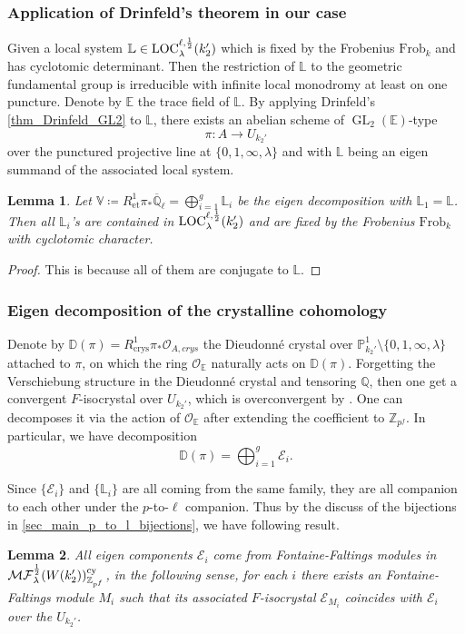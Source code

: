 \documentclass[12pt,twoside]{book}
\theoremstyle{plain}
\newtheorem{lemma}[lemma]{Lemma}
\theoremstyle{definition}
\theoremstyle{remark}
\newcommand{\bD}{{\mathbb D}}
\newcommand{\bL}{{\mathbb L}}
\newcommand{\bP}{{\mathbb P}}
\newcommand{\bQ}{{\mathbb Q}}
\newcommand{\bV}{{\mathbb V}}
\newcommand{\bZ}{{\mathbb Z}}
\newcommand{\mE}{{\mathcal E}}
\newcommand{\mO}{{\mathcal O}}
\DeclareMathOperator\GL{GL}
\newcommand{\crys}{\mathrm{crys}}
\newcommand{\et}{\mathrm{et}}
\newcommand{\MF}{\mathcal{MF}}
\newcommand{\Qbar}{{\overline{\mathbb Q}}}
\numberwithin{equation}{section}
\def\Loch{{\mathrm{LOC}^{\ell,{1\over 2}}_{\lambda}}}
\def\MFh{\MF^{{1\over 2}}_{\lambda}}
\def\Frob{\mathrm{Frob}}
\def\EK{{\mathbb E}}
\begin{document}
\subsubsection{Application of Drinfeld's theorem in our case}

Given a local system $\bL\in \Loch(k_2')$ which is fixed by the Frobenius $\Frob_k$ and has cyclotomic determinant. Then the restriction of $\bL$ to the geometric fundamental group is irreducible with infinite local monodromy at least on one puncture. Denote by $\EK$ the trace field of $\bL$. By applying Drinfeld's \autoref{thm_Drinfeld_GL2} to $\bL$, there exists an abelian scheme of $\GL_2(\EK)$-type
\[\pi \colon A \to U_{k_2'}\]
over the punctured projective line at $\{0,1,\infty,\lambda\}$ and with $\bL$ being an eigen summand of the associated local system.

\begin{lemma}
Let $\bV\coloneqq R^1_\et \pi_* \Qbar_{\ell}= \bigoplus_{i=1}^g \bL_i$ be the eigen decomposition with $\bL_1=\bL$. Then all $\bL_i$'s are contained in $\Loch(k_2')$ and are fixed by the Frobenius $\Frob_k$ with cyclotomic character.
\end{lemma}
\begin{proof}
This is because all of them are conjugate to $\bL$.
\end{proof}

\subsubsection{Eigen decomposition of the crystalline cohomology} \label{sec_subsub_family_to_rank2_cystal}
Denote by $\bD(\pi)=R^1_\crys \pi_* \mO_{A,crys}$ the Dieudonn\'e crystal over $\bP^1_{k_2'}\setminus\{0,1,\infty,\lambda\}$ attached to $\pi$, on which the ring $\mO_\EK$ naturally acts on $\bD(\pi)$. Forgetting the Verschiebung structure in the Dieudonn\'e crystal and tensoring $\bQ$, then one get a convergent $F$-isocrystal over $U_{k_2'}$, which is overconvergent by \cite[3.17]{Tri08}. One can decomposes it via the action of $\mO_\EK$ after extending the coefficient to $\bZ_{p^f}$. In particular, we have decomposition
\[\bD(\pi) = \bigoplus_{i=1}^{g}\mE_i.\]

Since $\{\mE_i\}$ and $\{\bL_i\}$ are all coming from the same family, they are all companion to each other under the $p$-to-$\ell$ companion. Thus by the discuss of the bijections in \autoref{sec_main_p_to_l_bijections}, we have following result.

\begin{lemma} \label{thm_p_to_l_from_family}
All eigen components $\mE_i$ come from Fontaine-Faltings modules in $\MFh(W(k_2'))^{\rm cy}_{\bZ_{p^f}}$, in the following sense, for each $i$ there exists an Fontaine-Faltings module $M_i$ such that its associated $F$-isocrystal $\mE_{M_i}$ coincides with $\mE_i$ over the $U_{k_2'}$.
\end{lemma}
\end{document}

